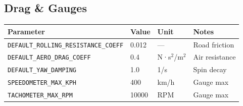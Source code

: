 \subsection{Drag \& Gauges}

\begin{table}[h]
  \centering
  \small
  \begin{tabular}{llll}
    \toprule
    \textbf{Parameter} & \textbf{Value} & \textbf{Unit} & \textbf{Notes} \\
    \midrule
    \texttt{DEFAULT\_ROLLING\_RESISTANCE\_COEFF} & 0.012 & — & Road friction \\
    \texttt{DEFAULT\_AERO\_DRAG\_COEFF} & 0.4 & N·s$^2$/m$^2$ & Air resistance \\
    \texttt{DEFAULT\_YAW\_DAMPING} & 1.0 & 1/s & Spin decay \\
    \texttt{SPEEDOMETER\_MAX\_KPH} & 400 & km/h & Gauge max \\
    \texttt{TACHOMETER\_MAX\_RPM} & 10000 & RPM & Gauge max \\
    \bottomrule
  \end{tabular}
\end{table}

\newpage
